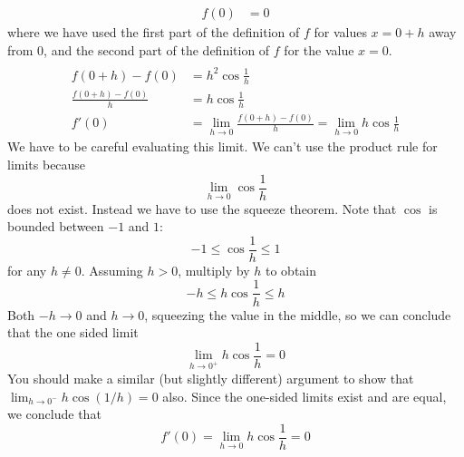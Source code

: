 \documentclass{article}
\begin{document}
\begin{enumerate}
\begin{align*}
    f(0) &= 0
  \end{align*}
  where we have used the first part of the definition of $f$ for
  values $x=0+h$ away from $0$, and the second part of the definition
  of $f$ for the value $x=0$.
  \begin{align*}
    \\
    f(0+h) - f(0) &= h^2 \cos \frac{1}{h}
    \\
    \frac{f(0+h)-f(0)}{h} &= h \cos \frac{1}{h}
    \\
    f'(0) &= \lim_{h\to 0} \frac{f(0+h)-f(0)}{h}
            = \lim_{h\to 0} h \cos \frac{1}{h}
  \end{align*}
  We have to be careful evaluating this limit.  We can't use the
  product rule for limits because
  \begin{equation*}
    \lim_{h\to 0} \cos \frac{1}{h}
  \end{equation*}
  does not exist.  Instead we have to use the squeeze theorem.  Note
  that $\cos$ is bounded between $-1$ and $1$:
  \begin{equation*}
    -1 \le \cos \frac{1}{h} \le 1
  \end{equation*}
  for any $h\ne 0$.  Assuming $h>0$, multiply by $h$ to obtain
  \begin{equation*}
    -h \le h \cos \frac{1}{h} \le h
  \end{equation*}
  Both $-h\to 0$ and $h\to 0$, squeezing the value in the middle, so
  we can conclude that the one sided limit
  \begin{equation*}
    \lim_{h\to 0^+} h \cos \frac{1}{h} = 0
  \end{equation*}
  You should make a similar (but slightly different) argument to show
  that $\lim_{h\to 0^-} h\cos (1/h) = 0$ also.  Since the one-sided
  limits exist and are equal, we conclude that
  \begin{equation*}
    f'(0) = \lim_{h\to 0} h \cos \frac{1}{h} = 0
  \end{equation*}
\end{enumerate}
\end{document}
